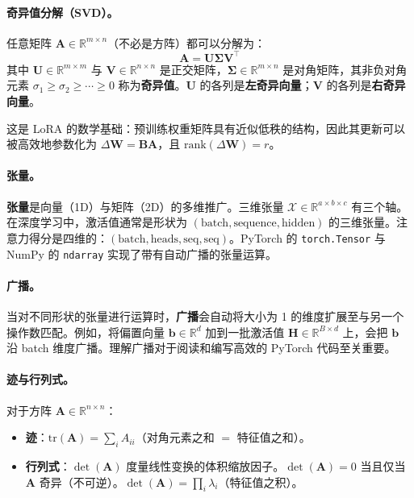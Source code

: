 \paragraph{奇异值分解（SVD）。}
任意矩阵 $\mathbf{A} \in \mathbb{R}^{m \times n}$（不必是方阵）都可以分解为：
\[
\mathbf{A} = \mathbf{U}\boldsymbol{\Sigma}\mathbf{V}^\top
\]
其中 $\mathbf{U} \in \mathbb{R}^{m \times m}$ 与 $\mathbf{V} \in \mathbb{R}^{n \times n}$ 是正交矩阵，$\boldsymbol{\Sigma} \in \mathbb{R}^{m \times n}$ 是对角矩阵，其非负对角元素 $\sigma_1 \geq \sigma_2 \geq \cdots \geq 0$ 称为\textbf{奇异值}。$\mathbf{U}$ 的各列是\textbf{左奇异向量}；$\mathbf{V}$ 的各列是\textbf{右奇异向量}。

这是 LoRA 的数学基础：预训练权重矩阵具有近似低秩的结构，因此其更新可以被高效地参数化为 $\Delta\mathbf{W} = \mathbf{B}\mathbf{A}$，且 $\mathrm{rank}(\Delta\mathbf{W}) = r$。

\paragraph{张量。}
\textbf{张量}是向量（1D）与矩阵（2D）的多维推广。三维张量 $\mathcal{X} \in \mathbb{R}^{a \times b \times c}$ 有三个轴。在深度学习中，激活值通常是形状为 $(\text{batch}, \text{sequence}, \text{hidden})$ 的三维张量。注意力得分是四维的：$(\text{batch}, \text{heads}, \text{seq}, \text{seq})$。PyTorch 的 \texttt{torch.Tensor} 与 NumPy 的 \texttt{ndarray} 实现了带有自动广播的张量运算。

\paragraph{广播。}
当对不同形状的张量进行运算时，\textbf{广播}会自动将大小为 1 的维度扩展至与另一个操作数匹配。例如，将偏置向量 $\mathbf{b} \in \mathbb{R}^d$ 加到一批激活值 $\mathbf{H} \in \mathbb{R}^{B \times d}$ 上，会把 $\mathbf{b}$ 沿 batch 维度广播。理解广播对于阅读和编写高效的 PyTorch 代码至关重要。

\paragraph{迹与行列式。}
对于方阵 $\mathbf{A} \in \mathbb{R}^{n \times n}$：
\begin{itemize}
  \item \textbf{迹}：$\mathrm{tr}(\mathbf{A}) = \sum_i A_{ii}$（对角元素之和 $=$ 特征值之和）。
  \item \textbf{行列式}：$\det(\mathbf{A})$ 度量线性变换的体积缩放因子。$\det(\mathbf{A}) = 0$ 当且仅当 $\mathbf{A}$ 奇异（不可逆）。$\det(\mathbf{A}) = \prod_i \lambda_i$（特征值之积）。
\end{itemize}

